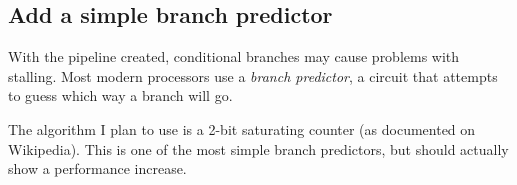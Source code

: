 \documentclass{article}
\begin{document}
\subsection{Add a simple branch predictor}
With the pipeline created, conditional branches may cause problems with stalling. Most modern processors use
a \textit{branch predictor}, a circuit that attempts to guess which way a branch will go.

The algorithm I plan to use is a 2-bit saturating counter (as documented on Wikipedia). This is one of the
most simple branch predictors, but should actually show a performance increase.







\end{document}
